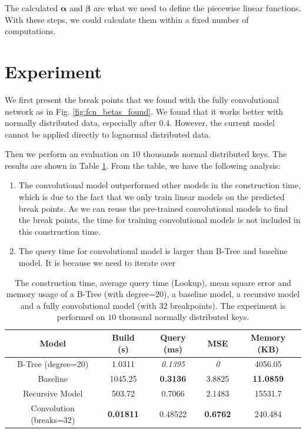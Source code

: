 The calculated $\boldsymbol{\alpha}$ and $\boldsymbol{\beta}$ are what we need to define the piecewise linear functions. With these steps, we could calculate them within a fixed number of computations. 

\section{Experiment}

We first present the break points that we found with the fully convolutional network as in Fig. \ref{fig:fcn_betas_found}. We found that it works better with normally distributed data, especially after $0.4$. However, the current model cannot be applied directly to lognormal distributed data.


Then we perform an evaluation on $10$ thousands normal distributed keys. The results are shown in Table \ref{fig:conv_table}. From the table, we have the following analysis:

\begin{enumerate}
	\item The convolutional model outperformed other models in the construction time, which is due to the fact that we only train linear models on the predicted break points. As we can reuse the pre-trained convolutional models to find the break points, the time for training convolutional models is not included in this construction time.
	\item The query time for convolutional model is larger than B-Tree and baseline model. It is because we need to iterate over 
\end{enumerate}


\begin{table}[h!]
\centering
\begin{tabular}{ |c|c|c|c|c| }
\hline
Model & Build (s) & Query (ms) & MSE & Memory (KB)\\ 
\hline
B-Tree (degree=20) & 1.0311 & \textit{0.1395} & \textit{0} & 4056.05 \\ 
\hline
Baseline & 1045.25 & \textbf{0.3136} & 3.8825 & \textbf{11.0859} \\
\hline
Recursive Model & 503.72 & 0.7066 & 2.1483 & 15531.7\\ 
\hline
Convolution (breaks=32) & \textbf{0.01811} & 0.48522 & \textbf{0.6762} & 240.484 \\
\hline
\end{tabular}
\caption{The construction time, average query time (Lookup), mean square error and memory usage of a B-Tree (with degree=20), a baseline model, a recursive model and a fully convolutional model (with 32 breakpoints). The experiment is performed on $10$ thousand normally distributed keys.} 
\label{fig:conv_table}
\end{table}

